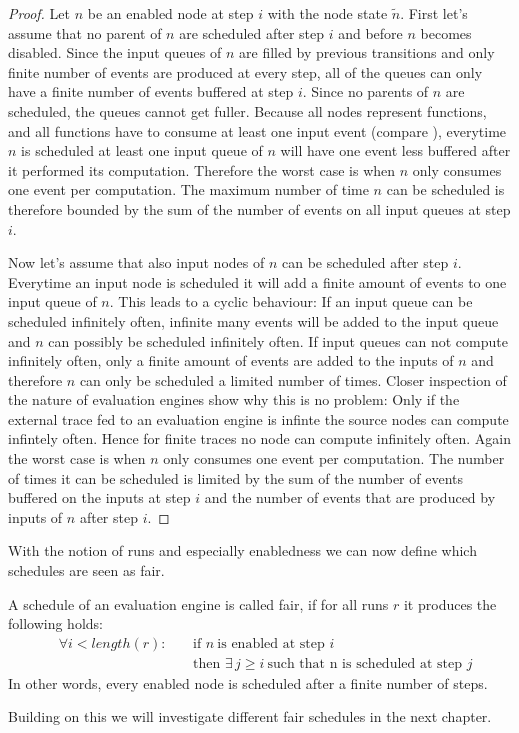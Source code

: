 \begin{proof}
  Let \(n\) be an enabled node at step \(i\) with the node state \(\widetilde{n}\).
  First let's assume that no parent of \(n\) are scheduled after step \(i\) and before \(n\) becomes disabled.
  Since the input queues of \(n\) are filled by previous transitions and only finite number of events are produced at every step, all of the queues can only have a finite number of events buffered at step \(i\).
  Since no parents of \(n\) are scheduled, the queues cannot get fuller.
  Because all nodes represent functions, and all functions have to consume at least one input event (compare ), everytime \(n\) is scheduled at least one input queue of \(n\) will have one event less buffered after it performed its computation.
  Therefore the worst case is when \(n\) only consumes one event per computation.
  The maximum number of time \(n\) can be scheduled is therefore bounded by the sum of the number of events on all input queues at step \(i\).

  Now let's assume that also input nodes of \(n\) can be scheduled after step \(i\).
  Everytime an input node is scheduled it will add a finite amount of events to one input queue of \(n\).
  This leads to a cyclic behaviour: If an input queue can be scheduled infinitely often, infinite many events will be added to the input queue and \(n\) can possibly be scheduled infinitely often.
  If input queues can not compute infinitely often, only a finite amount of events are added to the inputs of \(n\) and therefore \(n\) can only be scheduled a limited number of times.
  Closer inspection of the nature of evaluation engines show why this is no problem: Only if the external trace fed to an evaluation engine is infinte the source nodes can compute infintely often.
  Hence for finite traces no node can compute infinitely often.
  Again the worst case is when \(n\) only consumes one event per computation.
  The number of times it can be scheduled is limited by the sum of the number of events buffered on the inputs at step \(i\) and the number of events that are produced by inputs of \(n\) after step \(i\).
\end{proof}

With the notion of runs and especially enabledness we can now define which schedules are seen as fair.

\begin{definition}[name = Fair Schedules]\label{def:fair_schedule}
  A schedule of an evaluation engine is called fair, if for all runs \(r\)  it produces the following holds:
  \begin{align*}
    &\forall i < \mathit{length}(r):\ &&\text{if }n\ \text{is enabled at step } i\\
    &                                 &&\text{then } \exists\, j \geq i\ \text{such that n is scheduled at step } j
\end{align*}
In other words, every enabled node is scheduled after a finite number of steps.
\end{definition}

Building on this we will investigate different fair schedules in the next chapter.
